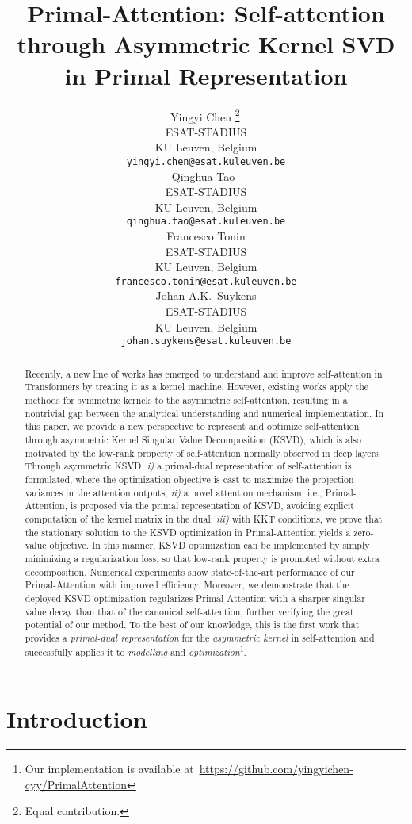 \documentclass{article}
\title{Primal-Attention: Self-attention through  
	Asymmetric Kernel SVD in Primal Representation}
\author{
	Yingyi Chen
	\thanks{Equal contribution.}\,
	\\
	ESAT-STADIUS \\
	KU Leuven, Belgium \\
	\texttt{yingyi.chen@esat.kuleuven.be} \\
	\And
	Qinghua Tao 
	\footnotemark[1]\,
	\\
	ESAT-STADIUS \\
	KU Leuven, Belgium \\
	\texttt{qinghua.tao@esat.kuleuven.be} \\
	\And
	Francesco Tonin \\
	ESAT-STADIUS \\
	KU Leuven, Belgium \\
	\texttt{francesco.tonin@esat.kuleuven.be} \\
	\And
	Johan A.K.~Suykens \\
	ESAT-STADIUS \\
	KU Leuven, Belgium \\
	\texttt{johan.suykens@esat.kuleuven.be} \\
}
\begin{document}
	
	
	\maketitle
	
	
	\begin{abstract}
		Recently, a new line of works has emerged to understand and improve self-attention in Transformers by treating it as a kernel machine. 
		However, existing works apply the methods for symmetric kernels to the asymmetric self-attention, resulting in a nontrivial gap between the analytical understanding and numerical implementation. 
		In this paper, we provide a new perspective to represent and optimize self-attention through asymmetric Kernel Singular Value Decomposition (KSVD), which is also motivated by the low-rank property of self-attention normally observed in deep layers.
		Through asymmetric KSVD, 
		\emph{i)} a primal-dual representation of self-attention is formulated, where the optimization objective is cast to maximize the projection variances in the attention outputs;
		\emph{ii)} a novel attention mechanism, i.e., Primal-Attention, is proposed via the primal representation of KSVD, avoiding explicit computation of the kernel matrix in the dual; 
		\emph{iii)}
		with KKT conditions, we prove that the stationary solution to the KSVD optimization in Primal-Attention yields a {zero-value} objective. In this manner, KSVD optimization can be implemented by simply minimizing a regularization loss, so that low-rank property is promoted without extra decomposition.
		Numerical experiments show state-of-the-art performance of our Primal-Attention with improved efficiency. 
		Moreover, we demonstrate that the deployed KSVD optimization regularizes Primal-Attention with a sharper singular value decay than that of the canonical self-attention, further verifying the great potential of our method.
		To the best of our knowledge, this is the first work that provides a \emph{primal-dual representation} for the \emph{asymmetric kernel} in self-attention and successfully applies it to \emph{modelling} and \emph{optimization}\footnote{Our implementation is available at~\url{https://github.com/yingyichen-cyy/PrimalAttention}}.
		
		
		
		
		
	\end{abstract}
	
	
	\section{Introduction}
	\label{sec::intro}
	
\end{document}
